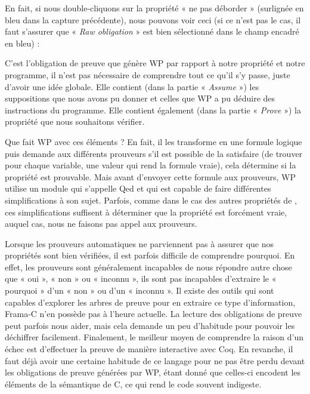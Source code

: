 En fait, si nous double-cliquons sur la 
propriété « ne pas déborder » (surlignée en bleu dans la capture précédente), 
nous pouvons voir ceci (si ce n'est pas le cas, il faut s'assurer que
« \textit{Raw obligation} » est bien sélectionné dans le champ encadré en bleu) :





C'est l'obligation de preuve que génère WP par rapport à notre propriété et 
notre programme, il n'est pas nécessaire de comprendre tout ce qu'il s'y passe, 
juste d'avoir une idée globale. Elle contient (dans la partie « \textit{Assume} ») les 
suppositions que nous avons pu donner et celles que WP a pu déduire des 
instructions du programme. Elle contient également (dans la partie « \textit{Prove} ») 
la propriété que nous souhaitons vérifier.



Que fait WP avec ces éléments ? En fait, il les transforme en une formule 
logique puis demande aux différents prouveurs s'il est possible de la 
satisfaire (de trouver pour chaque variable, une valeur qui rend la formule 
vraie), cela détermine si la propriété est prouvable. Mais avant d'envoyer 
cette formule aux prouveurs, WP utilise un module qui s'appelle Qed et qui est
capable de faire différentes simplifications à son sujet. Parfois, comme dans 
le cas des autres propriétés de , ces simplifications suffisent à 
déterminer que la propriété est forcément vraie, auquel cas, nous ne faisons
pas appel aux prouveurs.



Lorsque les prouveurs automatiques ne parviennent pas à assurer que nos 
propriétés sont bien vérifiées, il est parfois difficile de comprendre 
pourquoi. En effet, les prouveurs sont généralement incapables de nous 
répondre autre chose que « oui », « non » ou « inconnu », ils sont pas
incapables d'extraire le « pourquoi » d'un « non » ou d'un « inconnu ». Il
existe des outils qui
sont capables d'explorer les arbres de preuve pour en extraire ce type 
d'information, Frama-C n'en possède pas à l'heure actuelle. La lecture des
obligations de preuve peut parfois nous aider, mais cela demande un peu 
d'habitude pour pouvoir les déchiffrer facilement. Finalement, le meilleur
moyen de comprendre la raison d'un échec est d'effectuer la preuve de manière
interactive avec Coq. En revanche, il faut déjà avoir une certaine habitude de
ce langage pour ne pas être perdu devant les obligations de preuve générées par
WP, étant donné que celles-ci encodent les éléments de la sémantique de C, ce 
qui rend le code souvent indigeste.



